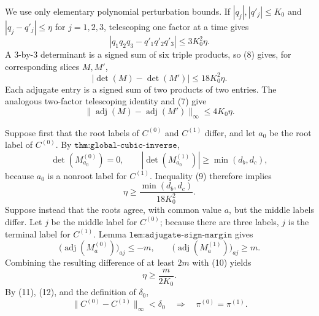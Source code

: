 We use only elementary polynomial perturbation bounds.  If \(|q_j|,|q'_j|\leq K_0\) and \(|q_j-q'_j|\leq\eta\) for \(j=1,2,3\), telescoping one factor at a time gives
\[
 |q_1q_2q_3-q'_1q'_2q'_3|
 \leq3K_0^2\eta.                                                  \tag{8}
\]
A \(3\)-by-\(3\) determinant is a signed sum of six triple products, so (8) gives, for corresponding slices \(M,M'\),
\[
 |\det(M)-\det(M')|\leq18K_0^2\eta.                              \tag{9}
\]
Each adjugate entry is a signed sum of two products of two entries.  The analogous two-factor telescoping identity and (7) give
\[
 \|\operatorname{adj}(M)-\operatorname{adj}(M')\|_\infty
 \leq4K_0\eta.                                                    \tag{10}
\]

Suppose first that the root labels of \(C^{(0)}\) and \(C^{(1)}\) differ, and let \(a_0\) be the root label of \(C^{(0)}\).  By \(\texttt{thm:global-cubic-inverse}\),
\[
 \det(M_{a_0}^{(0)})=0,
 \qquad
 |\det(M_{a_0}^{(1)})|\geq\min(d_b,d_c),
\]
because \(a_0\) is a nonroot label for \(C^{(1)}\).  Inequality (9) therefore implies
\[
 \eta\geq\frac{\min(d_b,d_c)}{18K_0^2}.                           \tag{11}
\]
Suppose instead that the roots agree, with common value \(a\), but the middle labels differ.  Let \(j\) be the middle label for \(C^{(0)}\); because there are three labels, \(j\) is the terminal label for \(C^{(1)}\).  Lemma \(\texttt{lem:adjugate-sign-margin}\) gives
\[
 \bigl(\operatorname{adj}(M_a^{(0)})\bigr)_{aj}\leq-m,
 \qquad
 \bigl(\operatorname{adj}(M_a^{(1)})\bigr)_{aj}\geq m.
\]
Combining the resulting difference of at least \(2m\) with (10) yields
\[
 \eta\geq\frac{m}{2K_0}.                                         \tag{12}
\]
By (11), (12), and the definition of \(\delta_0\),
\[
 \|C^{(0)}-C^{(1)}\|_\infty<\delta_0
 \quad\Longrightarrow\quad
 \pi^{(0)}=\pi^{(1)}.                                             \tag{13}
\]

